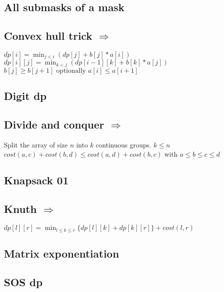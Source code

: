 
\subsection{All submasks of a mask }


\subsection{Convex hull trick  $\Rightarrow$ }

$ dp[i] = \min_{j < i}(dp[j] + b[j] * a[i]) $ \\
$ dp[i][j] = \min_{k < j}(dp[i - 1][k] + b[k] * a[j]) $ \\
$ b[j] \geq b[j + 1] \text{ optionally } a[i] \leq a[i + 1] $ \\ 

\subsection{Digit dp }


\subsection{Divide and conquer  $\Rightarrow$ }

Split the array of size $n$ into $k$ continuous groups. $k \leq n$ \\
$ cost(a, c) + cost(b, d) \leq cost(a, d) + cost(b, c)$ with $a \leq b \leq c \leq d$ \\

\subsection{Knapsack 01 }

\subsection{Knuth  $\Rightarrow$ }

$ dp[l][r] = \min_{l \leq k \leq r}\{dp[l][k] + dp[k][r]\} + cost(l, r)$ \\

\subsection{Matrix exponentiation }

\subsection{SOS dp }
